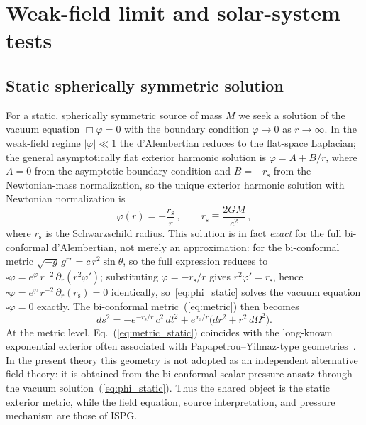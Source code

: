 \documentclass[aps,prd,onecolumn,superscriptaddress,nofootinbib,showpacs,12pt]{revtex4-2}
\newcommand{\rs}{r_{\mathrm{s}}}
\begin{document}
\section{Weak-field limit and solar-system tests}\label{sec:solar}

\subsection{Static spherically symmetric solution}\label{sec:static}

For a static, spherically symmetric source of mass $M$
we seek a solution of the vacuum equation $\Box\varphi = 0$
with the boundary condition $\varphi \to 0$ as $r \to \infty$.
In the weak-field regime $|\varphi| \ll 1$ the d'Alembertian
reduces to the flat-space Laplacian; the general
asymptotically flat exterior harmonic solution is
$\varphi = A + B/r$, where $A=0$ from the asymptotic boundary
condition and $B = -\rs$ from the Newtonian-mass normalization,
so the unique exterior harmonic solution with Newtonian
normalization is
\begin{equation}\label{eq:phi_static}
  \varphi(r) = -\frac{\rs}{r}\,,\qquad
  \rs \equiv \frac{2GM}{c^{2}}\,,
\end{equation}
where $\rs$ is the Schwarzschild radius. This solution is
in fact \emph{exact} for the full bi-conformal d'Alembertian,
not merely an approximation: for the bi-conformal metric
$\sqrt{-g}\,g^{rr} = c\,r^2\sin\theta$, so the full expression
reduces to $\square\varphi = e^{\varphi}\,r^{-2}\,\partial_r(r^2\varphi')$;
substituting $\varphi=-\rs/r$ gives
$r^2\varphi' = \rs$, hence
$\square\varphi = e^{\varphi}\,r^{-2}\,\partial_r(\rs) = 0$
identically, so~\eqref{eq:phi_static} solves the vacuum equation
$\square\varphi = 0$ exactly.  The bi-conformal
metric~(\ref{eq:metric}) then becomes
\begin{equation}\label{eq:metric_static}
  ds^{2} = -e^{-\rs/r}\,c^{2}\,dt^{2}
           + e^{\,\rs/r}\bigl(dr^{2} + r^{2}\,d\Omega^{2}\bigr).
\end{equation}
At the metric level, Eq.~(\ref{eq:metric_static}) coincides with the
long-known exponential exterior often associated with
Papapetrou--Yilmaz-type geometries~\cite{Papapetrou1954,Yilmaz1958,Boonserm2020}.
In the present theory this
geometry is not adopted as an independent alternative field theory:
it is obtained from the bi-conformal scalar-pressure ansatz through
the vacuum solution~(\ref{eq:phi_static}).  Thus the shared object is
the static exterior metric, while the field equation, source
interpretation, and pressure mechanism are those of ISPG.
\end{document}
